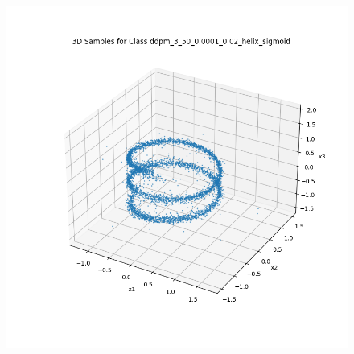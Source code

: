 \documentclass[a4paper,12pt]{article}
\begin{document}
\begin{figure}[h]
\begin{minipage}{0.3\textwidth}
  \end{minipage}
  \begin{minipage}{0.3\textwidth}
      \centering
      \includegraphics[width=\linewidth]{"images/Samples for ddpm_3_50_0.0001_0.02_helix_sigmoid.png"}
  \end{minipage}

  \vspace{0.5cm}


\end{figure}
\end{document}
